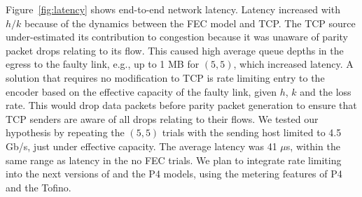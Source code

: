 Figure~\ref{fig:latency} shows end-to-end network latency. Latency increased
with $h/k$ because of the dynamics between the FEC model and TCP. The TCP
source under-estimated its contribution to congestion because it was unaware
of parity packet drops relating to its flow. This caused high average queue
depths in the egress to the faulty link, e.g., up to 1 MB for $(5,5)$, which
increased latency. A solution that requires no modification to TCP is rate
limiting entry to the encoder based on the effective capacity of the faulty
link, given $h$, $k$ and the loss rate. This would drop data packets before
parity packet generation to ensure that TCP senders are aware of  all drops
relating to their flows. We tested our hypothesis by repeating the $(5, 5)$
trials with the sending host limited to 4.5 Gb/s, just under effective
capacity. The average latency was 41 $\mu$s, within the same range as latency
in the no FEC trials. We plan to integrate rate limiting into the next
versions of \OurSys and the P4 models, using the metering features of P4 and
the Tofino.









